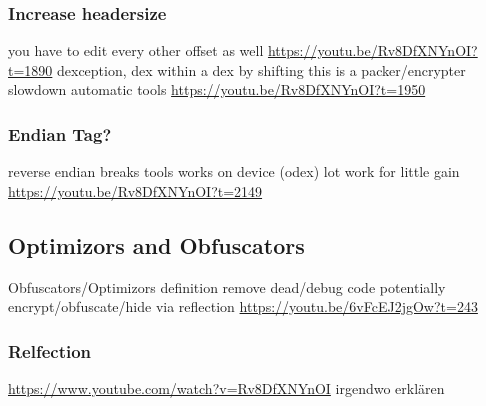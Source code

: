 \subsubsection{Increase headersize}
you have to edit every other offset as well\newline
\url{https://youtu.be/Rv8DfXNYnOI?t=1890}\newline
dexception, dex within a dex by shifting\newline
this is a packer/encrypter\newline
slowdown automatic tools\newline
\url{https://youtu.be/Rv8DfXNYnOI?t=1950}\newline
\subsubsection{Endian Tag?}
reverse endian\newline
breaks tools works on device (odex)\newline
lot work for little gain\newline
\url{https://youtu.be/Rv8DfXNYnOI?t=2149}



\subsection{Optimizors and Obfuscators}
Obfuscators/Optimizors definition\newline
remove dead/debug code\newline
potentially encrypt/obfuscate/hide via reflection\newline
\url{https://youtu.be/6vFcEJ2jgOw?t=243}\newline
\subsubsection{Relfection}\label{subsection:basic-}
\url{https://www.youtube.com/watch?v=Rv8DfXNYnOI}\newline
irgendwo erklären
